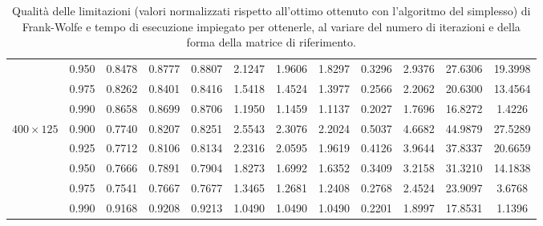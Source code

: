 \begin{landscape}
\begin{table}[!h]
\begin{tabularx}{641.68651pt}{cccccccccccc}
        & 0.950 & 0.8478 & 0.8777 & 0.8807 & 2.1247 & 1.9606 & 1.8297 & 0.3296 & 2.9376 & 27.6306 & 19.3998 \\
        & 0.975 & 0.8262 & 0.8401 & 0.8416 & 1.5418 & 1.4524 & 1.3977 & 0.2566 & 2.2062 & 20.6300 & 13.4564 \\
        & 0.990 & 0.8658 & 0.8699 & 0.8706 & 1.1950 & 1.1459 & 1.1137 & 0.2027 & 1.7696 & 16.8272 & 1.4226 \\
        \midrule
        \( 400\times 125 \)
        & 0.900 & 0.7740 & 0.8207 & 0.8251 & 2.5543 & 2.3076 & 2.2024 & 0.5037 & 4.6682 & 44.9879 & 27.5289 \\
        & 0.925 & 0.7712 & 0.8106 & 0.8134 & 2.2316 & 2.0595 & 1.9619 & 0.4126 & 3.9644 & 37.8337 & 20.6659 \\
        & 0.950 & 0.7666 & 0.7891 & 0.7904 & 1.8273 & 1.6992 & 1.6352 & 0.3409 & 3.2158 & 31.3210 & 14.1838 \\
        & 0.975 & 0.7541 & 0.7667 & 0.7677 & 1.3465 & 1.2681 & 1.2408 & 0.2768 & 2.4524 & 23.9097 & 3.6768 \\
        & 0.990 & 0.9168 & 0.9208 & 0.9213 & 1.0490 & 1.0490 & 1.0490 & 0.2201 & 1.8997 & 17.8531 & 1.1396 \\
        \bottomrule
    \end{tabularx}
    \caption{Qualità delle limitazioni (valori normalizzati rispetto all'ottimo ottenuto con l'algoritmo del simplesso)
    di Frank-Wolfe e tempo di esecuzione impiegato per ottenerle, al variare del numero di iterazioni e della forma
    della matrice di riferimento.}
    \label{table:hugetable2}
\end{table}
\end{landscape}

